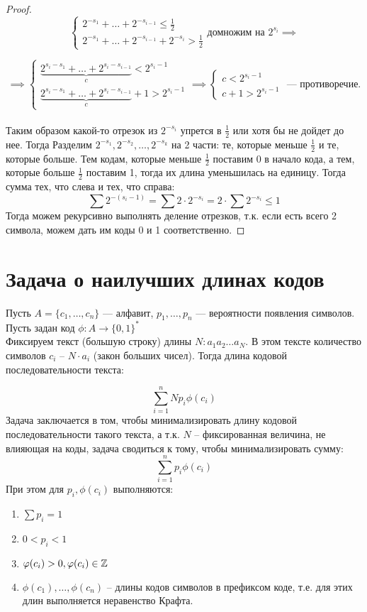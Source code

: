 \begin{proof}
    $$\begin{cases}
        2^{-s_1} + \ldots + 2^{-s_{i-1}} \leq \frac{1}{2}\\
        2^{-s_1} + \ldots + 2^{-s_{i-1}} + 2^{-s_i} > \frac{1}{2}
    \end{cases} \text{домножим на } 2^{s_{i}}\implies$$

    $$\implies \begin{cases}
        \underbrace{2^{s_i - s_1} + \ldots + 2^{s_i - s_{i-1}}}_c < 2^{s_i-1}\\
        \underbrace{2^{s_i - s_1} + \ldots + 2^{s_i - s_{i-1}}}_c + 1 > 2^{s_i-1}
    \end{cases} \implies \begin{cases}
        c < 2^{s_i-1}\\
        c + 1 > 2^{s_i-1}
    \end{cases} \text{ --- противоречие.}$$\\
    Таким образом какой-то отрезок из $2^{-s_i}$ упрется в $\frac{1}{2}$ или хотя бы не дойдет до нее. Тогда 
    Разделим $2^{-s_1}, 2^{-s_2}, \ldots, 2^{-s_k}$ на 2 части: те, которые меньше $\frac{1}{2}$ и те, которые больше.
    Тем кодам, которые меньше $\frac{1}{2}$ поставим 0 в начало кода, а тем, которые больше $\frac{1}{2}$ поставим 1, тогда их длина уменьшилась на единицу. 
    Тогда сумма тех, что слева и тех, что справа:
    \[\sum 2^{-(s_i-1)} = \sum 2 \cdot 2^{-s_i} = 2 \cdot \sum 2^{-s_i} \leq 1\]
    Тогда можем рекурсивно выполнять деление отрезков, т.к. если есть всего 2 символа,
    можем дать им коды 0 и 1 соответственно.
\end{proof}

\section{Задача о наилучших длинах кодов}
Пусть $A = \{c_1, \ldots, c_n\}$ --- алфавит, $p_1, \ldots, p_n$ --- вероятности появления символов. Пусть задан код $\phi: A \to \{0, 1\}^*$\\
Фиксируем текст (большую строку) длины $N: a_1 a_2\ldots a_N$. В этом тексте количество символов $c_i$ -- $N \cdot a_i$ (закон больших чисел). Тогда длина кодовой последовательности текста:

\[\sum_{i=1}^{n} N p_i \phi(c_i)\]
Задача заключается в том, чтобы минимализировать длину кодовой последовательности такого текста,
а т.к. $N$ -- фиксированная величина, не влияющая на коды, задача сводиться к тому, чтобы минимализировать сумму:
\[\sum_{i=1}^{n}p_i \phi(c_i)\]
При этом для $p_i, \phi(c_i)$ выполняются:
\begin{enumerate}
    \item $\sum p_i = 1$
    \item $0 < p_i < 1$
    \item $\varphi(c_i) > 0, \varphi(c_i) \in \mathbb{Z}$
    \item $\phi(c_1), \ldots, \phi(c_n)$ -- длины кодов символов в префиксом коде, т.е. для этих длин выполняется неравенство Крафта.
\end{enumerate}

